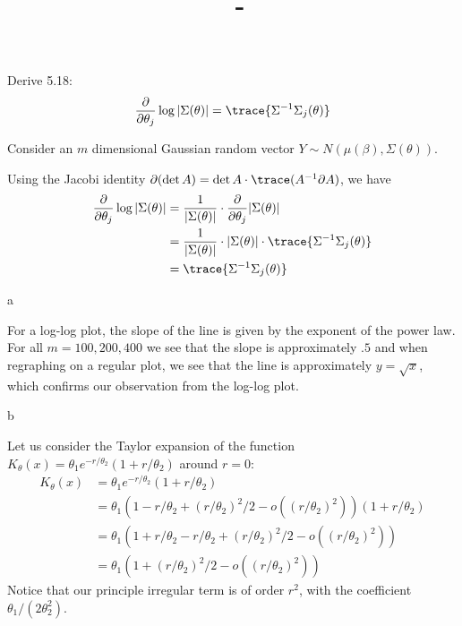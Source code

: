 \documentclass[answers,12pt,addpoints]{exam}
\author{\name}
\title{\course \ - \assignment}
\begin{document}
\maketitle

\newpage
\begin{questions}

Derive 5.18: 
$$ \frac{\partial}{\partial \theta_j} \log | \Sigma (\theta) | = \trace\{ \Sigma^{-1} \Sigma_j(\theta) \} $$
\begin{solution}
    Consider an $m$ dimensional Gaussian random vector $Y \sim N(\mu(\beta), \Sigma(\theta))$.
    
    Using the Jacobi identity $\partial (\det A) = \det A \cdot \trace (A^{-1} \partial A)$, we have
    \begin{align*}
        \frac{\partial}{\partial \theta_j} \log | \Sigma (\theta) | &= \frac{1}{|\Sigma(\theta)|} \cdot \frac{\partial}{\partial \theta_j} |\Sigma(\theta)| \\
        &= \frac{1}{|\Sigma(\theta)|} \cdot |\Sigma(\theta)| \cdot \trace\{ \Sigma^{-1} \Sigma_j(\theta) \} \\
        &= \trace\{ \Sigma^{-1} \Sigma_j(\theta) \}
    \end{align*}

    
\end{solution}

 a

\begin{solution}
    For a log-log plot, the slope of the line is given by the exponent of the power law. For all $m =100,200,400$ we see that the slope is approximately $.5$ and when regraphing on a regular plot, we see that the line is approximately $y = \sqrt{x}$, which confirms our observation from the log-log plot.
\end{solution}

 b

\begin{solution}
    Let us consider the Taylor expansion of the function $K_\theta(x) = \theta_1 e^{-r / \theta_2}(1+r/\theta_2)$ around $r=0$:
\begin{align*}
    K_\theta(x) &= \theta_1 e^{-r / \theta_2}(1+r/\theta_2) \\
    &= \theta_1 (1 - r/\theta_2 + (r/\theta_2)^2/2 - o((r/\theta_2)^2))(1 + r/\theta_2) \\
    &= \theta_1 (1 + r/\theta_2 - r/\theta_2 + (r/\theta_2)^2/2 - o((r/\theta_2)^2)) \\
    &= \theta_1 (1 + (r/\theta_2)^2/2 - o((r/\theta_2)^2))
\end{align*}
Notice that our principle irregular term is of order $r^2$, with the coefficient $\theta_1 / (2 \theta_2^2)$. 


\end{solution}
\end{questions}
\end{document}
